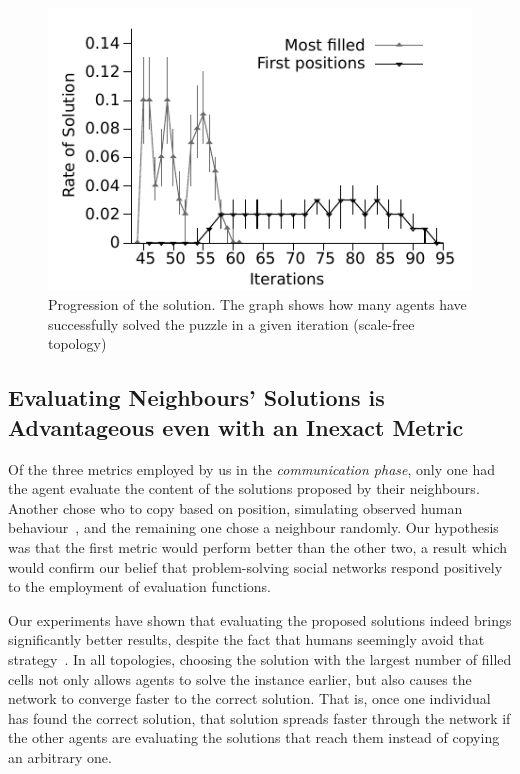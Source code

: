 \documentclass{article}
\begin{document}
\begin{figure}
\includegraphics[scale=1]{ijcai_sudoku/geral}
\caption{Progression of the solution. The graph shows how many agents have successfully solved the puzzle in a given iteration (scale-free topology)}
\label{fig:global_gauss}
\end{figure}

\subsection{Evaluating Neighbours' Solutions is Advantageous even with an Inexact Metric}

Of the three metrics employed by us in the \emph{communication phase}, only one had the agent evaluate the content of the solutions proposed by their neighbours. Another chose who to copy based on position, simulating observed human behaviour~\cite{farenzena:collabem}, and the remaining one chose a neighbour randomly. Our hypothesis was that the first metric would perform better than the other two, a result which would confirm our belief that problem-solving social networks respond positively to the employment of evaluation functions.

Our experiments have shown that evaluating the proposed solutions indeed brings significantly better results, despite the fact that humans seemingly avoid that strategy~\cite{farenzena:collabem}. In all topologies, choosing the solution with the largest number of filled cells not only allows agents to solve the instance earlier, but also causes the network to converge faster to the correct solution. That is, once one individual has found the correct solution, that solution spreads faster through the network if the other agents are evaluating the solutions that reach them instead of copying an arbitrary one.
\end{document}

